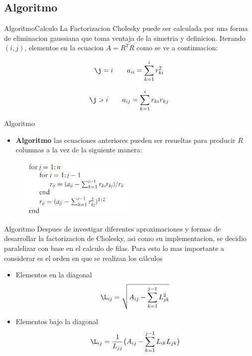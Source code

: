 \documentclass{beamer}
\begin{document}
\subsection{Algoritmo}

\begin{frame}{Algoritmo}{Calculo}
La Factorizacion Cholesky puede ser calculada por una forma de eliminacion gaussiana que toma ventaja de la simetria y definicion. Iterando $(i,j)$, elementos en la ecuacion $A = R^TR$ como se ve a continuacion:

\begin{equation}
\j = i \qquad a_{ii} = {\displaystyle\sum_{k=1}^{i}{r^2_{ki}}}
\end{equation}

\begin{equation}
\j>i \qquad a_{ij} = {\displaystyle\sum_{k=1}^{i}{r_{ki}}{r_{kj}}}
\end{equation}
\end{frame}

\begin{frame}{Algoritmo}
\begin{itemize}
\item \textbf{Algoritmo} las ecuaciones anteriores pueden ser resueltas para producir $R$ columnas a la vez de la siguiente manera:
\end{itemize}
\begin{figure}[h]
    \centering
    \includegraphics[width=0.5\textwidth]{for_cycle}
    \label{fig:mesh1}
\end{figure}
\end{frame}

\begin{frame}{Algoritmo}
Despues de investigar diferentes aproximaciones y formas de desarrollar la factorizacion de Cholesky, asi como su implementacion, se decidio paralelizar con base en el calculo de filas. Para esto lo mas importante a considerar es el orden en que se realizan los cálculos
\begin{itemize}
\item Elementos en la diagonal
\begin{equation}
\L_{ij}=\sqrt{A_{ij} - {\displaystyle\sum_{k=1}^{j-1} L^2_{jk}}} 
\end{equation}
\item Elementos bajo la diagonal
\begin{equation}
\L_{ij} = \frac{1}{L_{jj}} \big( A_{ij} - {\displaystyle\sum_{k=1}^{j-1} L_{ik}L_{jk}}\big)
\end{equation}
\end{itemize}
\end{frame}
\end{document}
